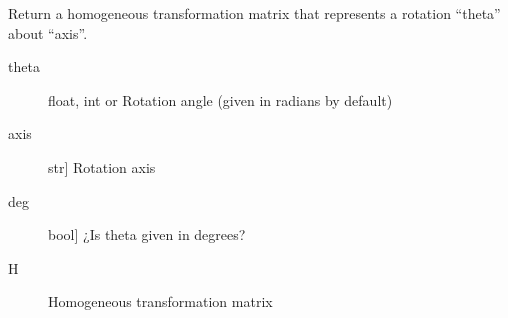 \documentclass[letterpaper,10pt,english]{sphinxmanual}
\begin{document}

\begin{fulllineitems}
\label{\detokenize{_src/didactic:rkd.didactic.transformations.htmrot}}
Return a homogeneous transformation matrix that represents a 
rotation “theta” about “axis”.
\begin{description}
\item[{theta}] \leavevmode{[}float, int or \sphinxtitleref{symbolic}{]}
Rotation angle (given in radians by default)

\item[{axis}] \leavevmode{[}str{]}
Rotation axis

\item[{deg}] \leavevmode{[}bool{]}
¿Is theta given in degrees?

\end{description}
\begin{description}
\item[{H}] \leavevmode{[}\sphinxcode{\sphinxupquote{sympy.matrices.dense.MutableDenseMatrix}}{]}
Homogeneous transformation matrix

\end{description}


\end{fulllineitems}
\end{document}
